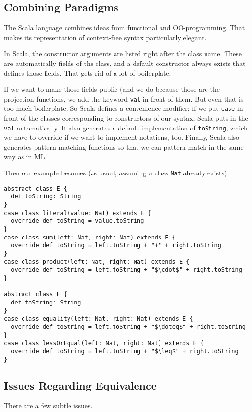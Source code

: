 \subsection{Combining Paradigms}\label{syn:impl:scala}

The Scala language combines ideas from functional and OO-programming.
That makes its representation of context-free syntax particularly elegant.

In Scala, the constructor arguments are listed right after the class name.
These are automatically fields of the class, and a default constructor always exists that defines those fields.
That gets rid of a lot of boilerplate.

If we want to make those fields public (and we do because those are the projection functions, we add the keyword \texttt{val} in front of them.
But even that is too much boilerplate. So Scala defines a convenience modifier: if we put \texttt{case} in front of the classes corresponding to constructors of our syntax, Scala puts in the \texttt{val} automatically.
It also generates a default implementation of \texttt{toString}, which we have to override if we want to implement notations, too.
Finally, Scala also generates pattern-matching functions so that we can pattern-match in the same way as in ML.

Then our example becomes (as usual, assuming a class \texttt{Nat} already exists):

\begin{lstlisting}
abstract class E {
  def toString: String
}
case class literal(value: Nat) extends E {
  override def toString = value.toString
}
case class sum(left: Nat, right: Nat) extends E {
  override def toString = left.toString + "+" + right.toString
}
case class product(left: Nat, right: Nat) extends E {
  override def toString = left.toString + "$\cdot$" + right.toString
}

abstract class F {
  def toString: String
}
case class equality(left: Nat, right: Nat) extends E {
  override def toString = left.toString + "$\doteq$" + right.toString
}
case class lessOrEqual(left: Nat, right: Nat) extends E {
  override def toString = left.toString + "$\leq$" + right.toString
}
\end{lstlisting}

\subsection{Issues Regarding Equivalence}

There are a few subtle issues.

